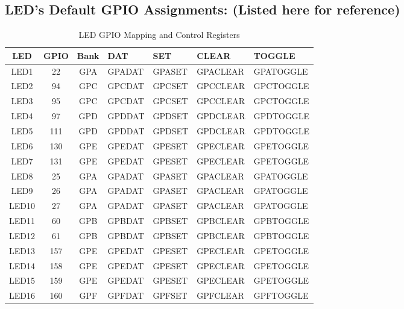 \documentclass[11pt]{article}
\begin{document}
\subsection*{LED’s Default GPIO Assignments: (Listed here for reference)}
%
\begin{table}[H]
    \centering
    \caption{LED GPIO Mapping and Control Registers}
    \label{tab:led_gpio_mapping}
    \renewcommand{\arraystretch}{1.15}
    \begin{tabular}{c c c l l l l}
        \toprule
        \textbf{LED} & \textbf{GPIO} & \textbf{Bank} & \textbf{DAT} & \textbf{SET} & \textbf{CLEAR} & \textbf{TOGGLE} \\
        \midrule
        LED1  & 22  & GPA & GPADAT & GPASET & GPACLEAR & GPATOGGLE \\
        LED2  & 94  & GPC & GPCDAT & GPCSET & GPCCLEAR & GPCTOGGLE \\
        LED3  & 95  & GPC & GPCDAT & GPCSET & GPCCLEAR & GPCTOGGLE \\
        LED4  & 97  & GPD & GPDDAT & GPDSET & GPDCLEAR & GPDTOGGLE \\
        LED5  & 111 & GPD & GPDDAT & GPDSET & GPDCLEAR & GPDTOGGLE \\
        LED6  & 130 & GPE & GPEDAT & GPESET & GPECLEAR & GPETOGGLE \\
        LED7  & 131 & GPE & GPEDAT & GPESET & GPECLEAR & GPETOGGLE \\
        LED8  & 25  & GPA & GPADAT & GPASET & GPACLEAR & GPATOGGLE \\
        LED9  & 26  & GPA & GPADAT & GPASET & GPACLEAR & GPATOGGLE \\
        LED10 & 27  & GPA & GPADAT & GPASET & GPACLEAR & GPATOGGLE \\
        LED11 & 60  & GPB & GPBDAT & GPBSET & GPBCLEAR & GPBTOGGLE \\
        LED12 & 61  & GPB & GPBDAT & GPBSET & GPBCLEAR & GPBTOGGLE \\
        LED13 & 157 & GPE & GPEDAT & GPESET & GPECLEAR & GPETOGGLE \\
        LED14 & 158 & GPE & GPEDAT & GPESET & GPECLEAR & GPETOGGLE \\
        LED15 & 159 & GPE & GPEDAT & GPESET & GPECLEAR & GPETOGGLE \\
        LED16 & 160 & GPF & GPFDAT & GPFSET & GPFCLEAR & GPFTOGGLE \\
        \bottomrule
    \end{tabular}
\end{table}
%
\end{document}
